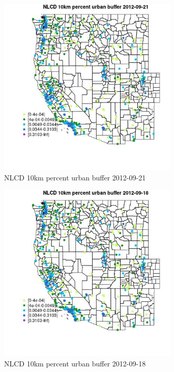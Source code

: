\begin{figure} 
\centering  
\includegraphics[width=0.77\textwidth]{Code_Outputs/Report_ML_input_PM25_Step4_part_e_de_duplicated_aves_compiled_2019-05-14wNAs_MapObsNLCD_10km_percent_urban_buffer2012-09-21.jpg} 
\caption{\label{fig:Report_ML_input_PM25_Step4_part_e_de_duplicated_aves_compiled_2019-05-14wNAsMapObsNLCD_10km_percent_urban_buffer2012-09-21}NLCD 10km percent urban buffer 2012-09-21} 
\end{figure} 
 

\begin{figure} 
\centering  
\includegraphics[width=0.77\textwidth]{Code_Outputs/Report_ML_input_PM25_Step4_part_e_de_duplicated_aves_compiled_2019-05-14wNAs_MapObsNLCD_10km_percent_urban_buffer2012-09-18.jpg} 
\caption{\label{fig:Report_ML_input_PM25_Step4_part_e_de_duplicated_aves_compiled_2019-05-14wNAsMapObsNLCD_10km_percent_urban_buffer2012-09-18}NLCD 10km percent urban buffer 2012-09-18} 
\end{figure} 
 

